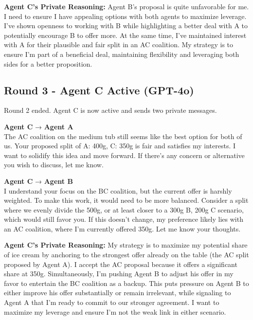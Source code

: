 \documentclass[11pt,a4paper]{article}
\newcommand{\agentname}[2]{\textbf{\textcolor{#1}{#2}}}
\begin{document}
\begin{reasoningbox}
\textbf{Agent C's Private Reasoning:} Agent B's proposal is quite unfavorable for me. I need to ensure I have appealing options with both agents to maximize leverage. I've shown openness to working with B while highlighting a better deal with A to potentially encourage B to offer more. At the same time, I've maintained interest with A for their plausible and fair split in an AC coalition. My strategy is to ensure I'm part of a beneficial deal, maintaining flexibility and leveraging both sides for a better proposition.
\end{reasoningbox}

\subsection{Round 3 - Agent C Active (GPT-4o)}

\begin{systemmsg}
Round 2 ended. Agent C is now active and sends two private messages.
\end{systemmsg}

\begin{agentCmsg}
\agentname{agentC}{Agent C} → \agentname{agentA}{Agent A}\\
The AC coalition on the medium tub still seems like the best option for both of us. Your proposed split of A: 400g, C: 350g is fair and satisfies my interests. I want to solidify this idea and move forward. If there's any concern or alternative you wish to discuss, let me know.
\end{agentCmsg}

\begin{agentCmsg}
\agentname{agentC}{Agent C} → \agentname{agentB}{Agent B}\\
I understand your focus on the BC coalition, but the current offer is harshly weighted. To make this work, it would need to be more balanced. Consider a split where we evenly divide the 500g, or at least closer to a 300g B, 200g C scenario, which would still favor you. If this doesn't change, my preference likely lies with an AC coalition, where I'm currently offered 350g. Let me know your thoughts.
\end{agentCmsg}

\begin{reasoningbox}
\textbf{Agent C's Private Reasoning:} My strategy is to maximize my potential share of ice cream by anchoring to the strongest offer already on the table (the AC split proposed by Agent A). I accept the AC proposal because it offers a significant share at 350g. Simultaneously, I'm pushing Agent B to adjust his offer in my favor to entertain the BC coalition as a backup. This puts pressure on Agent B to either improve his offer substantially or remain irrelevant, while signaling to Agent A that I'm ready to commit to our stronger agreement. I want to maximize my leverage and ensure I'm not the weak link in either scenario.
\end{reasoningbox}
\end{document}
